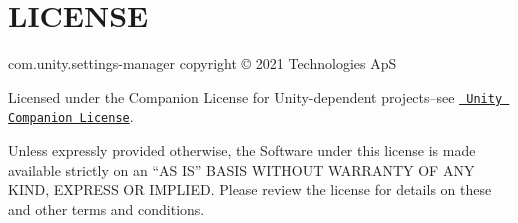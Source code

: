 \chapter{LICENSE}
\hypertarget{md__library_2_package_cache_2com_8unity_8settings-manager_0d2_80_81_2_l_i_c_e_n_s_e}{}\label{md__library_2_package_cache_2com_8unity_8settings-manager_0d2_80_81_2_l_i_c_e_n_s_e}
com.\+unity.\+settings-\/manager copyright © 2021  Technologies ApS

Licensed under the  Companion License for Unity-\/dependent projects--see \href{http://www.unity3d.com/legal/licenses/Unity_Companion_License}{\texttt{ Unity Companion License}}.

Unless expressly provided otherwise, the Software under this license is made available strictly on an “\+AS IS” BASIS WITHOUT WARRANTY OF ANY KIND, EXPRESS OR IMPLIED. Please review the license for details on these and other terms and conditions. 